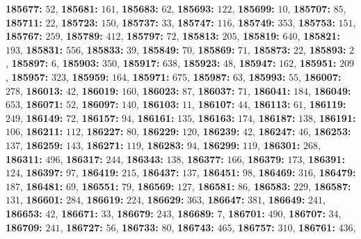 \textsf{\bfseries 185677:} $52$, \textsf{\bfseries 185681:} $161$, \textsf{\bfseries 185683:} $62$, \textsf{\bfseries 185693:} $122$, \textsf{\bfseries 185699:} $10$, \textsf{\bfseries 185707:} $85$, \textsf{\bfseries 185711:} $22$, \textsf{\bfseries 185723:} $150$, \textsf{\bfseries 185737:} $33$, \textsf{\bfseries 185747:} $116$, \textsf{\bfseries 185749:} $353$, \textsf{\bfseries 185753:} $151$, \textsf{\bfseries 185767:} $259$, \textsf{\bfseries 185789:} $412$, \textsf{\bfseries 185797:} $72$, \textsf{\bfseries 185813:} $205$, \textsf{\bfseries 185819:} $640$, \textsf{\bfseries 185821:} $193$, \textsf{\bfseries 185831:} $556$, \textsf{\bfseries 185833:} $39$, \textsf{\bfseries 185849:} $70$, \textsf{\bfseries 185869:} $71$, \textsf{\bfseries 185873:} $22$, \textsf{\bfseries 185893:} $2$, \textsf{\bfseries 185897:} $6$, \textsf{\bfseries 185903:} $350$, \textsf{\bfseries 185917:} $638$, \textsf{\bfseries 185923:} $48$, \textsf{\bfseries 185947:} $162$, \textsf{\bfseries 185951:} $209$, \textsf{\bfseries 185957:} $323$, \textsf{\bfseries 185959:} $164$, \textsf{\bfseries 185971:} $675$, \textsf{\bfseries 185987:} $63$, \textsf{\bfseries 185993:} $55$, \textsf{\bfseries 186007:} $278$, \textsf{\bfseries 186013:} $42$, \textsf{\bfseries 186019:} $160$, \textsf{\bfseries 186023:} $87$, \textsf{\bfseries 186037:} $71$, \textsf{\bfseries 186041:} $184$, \textsf{\bfseries 186049:} $653$, \textsf{\bfseries 186071:} $52$, \textsf{\bfseries 186097:} $140$, \textsf{\bfseries 186103:} $11$, \textsf{\bfseries 186107:} $44$, \textsf{\bfseries 186113:} $61$, \textsf{\bfseries 186119:} $249$, \textsf{\bfseries 186149:} $72$, \textsf{\bfseries 186157:} $94$, \textsf{\bfseries 186161:} $135$, \textsf{\bfseries 186163:} $174$, \textsf{\bfseries 186187:} $138$, \textsf{\bfseries 186191:} $106$, \textsf{\bfseries 186211:} $112$, \textsf{\bfseries 186227:} $80$, \textsf{\bfseries 186229:} $120$, \textsf{\bfseries 186239:} $42$, \textsf{\bfseries 186247:} $46$, \textsf{\bfseries 186253:} $137$, \textsf{\bfseries 186259:} $143$, \textsf{\bfseries 186271:} $119$, \textsf{\bfseries 186283:} $94$, \textsf{\bfseries 186299:} $119$, \textsf{\bfseries 186301:} $268$, \textsf{\bfseries 186311:} $496$, \textsf{\bfseries 186317:} $244$, \textsf{\bfseries 186343:} $138$, \textsf{\bfseries 186377:} $166$, \textsf{\bfseries 186379:} $173$, \textsf{\bfseries 186391:} $124$, \textsf{\bfseries 186397:} $97$, \textsf{\bfseries 186419:} $215$, \textsf{\bfseries 186437:} $137$, \textsf{\bfseries 186451:} $98$, \textsf{\bfseries 186469:} $316$, \textsf{\bfseries 186479:} $187$, \textsf{\bfseries 186481:} $69$, \textsf{\bfseries 186551:} $79$, \textsf{\bfseries 186569:} $127$, \textsf{\bfseries 186581:} $86$, \textsf{\bfseries 186583:} $229$, \textsf{\bfseries 186587:} $131$, \textsf{\bfseries 186601:} $284$, \textsf{\bfseries 186619:} $224$, \textsf{\bfseries 186629:} $363$, \textsf{\bfseries 186647:} $381$, \textsf{\bfseries 186649:} $241$, \textsf{\bfseries 186653:} $42$, \textsf{\bfseries 186671:} $33$, \textsf{\bfseries 186679:} $243$, \textsf{\bfseries 186689:} $7$, \textsf{\bfseries 186701:} $490$, \textsf{\bfseries 186707:} $34$, \textsf{\bfseries 186709:} $241$, \textsf{\bfseries 186727:} $56$, \textsf{\bfseries 186733:} $80$, \textsf{\bfseries 186743:} $465$, \textsf{\bfseries 186757:} $310$, \textsf{\bfseries 186761:} $436$, 
